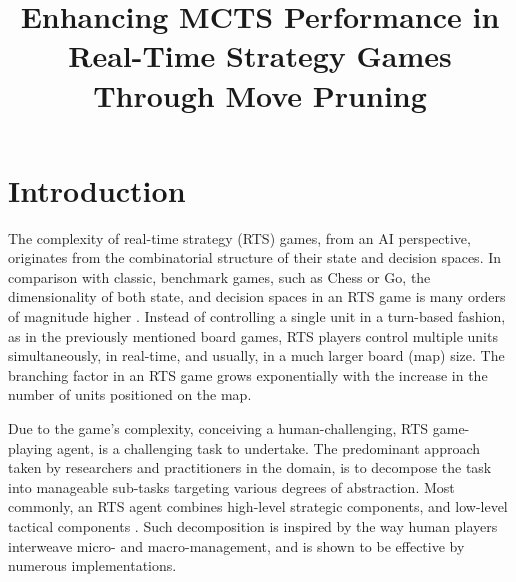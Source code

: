 \documentclass[conference]{IEEEtran}
\begin{document}
\title{Enhancing MCTS Performance in Real-Time Strategy Games Through Move Pruning}

\author{


}

\maketitle

\begin{abstract}

\end{abstract}

\begin{IEEEkeywords}

\end{IEEEkeywords}

\section{Introduction}

The complexity of real-time strategy (RTS) games, from an AI perspective, originates from the combinatorial structure of their state and decision spaces. In comparison with classic, benchmark games, such as Chess or Go, the dimensionality of both state, and decision spaces in an RTS game is many orders of magnitude higher \cite{ontanon_survey_2013}. Instead of controlling a single unit in a turn-based fashion, as in the previously mentioned board games, RTS players control multiple units simultaneously, in real-time, and usually, in a much larger board (map) size. The branching factor in an RTS game grows exponentially with the increase in the number of units positioned on the map.

Due to the game's complexity, conceiving a human-challenging, RTS game-playing agent, is a challenging task to undertake. The predominant approach taken by researchers and practitioners in the domain, is to decompose the task into manageable sub-tasks targeting various degrees of abstraction. Most commonly, an RTS agent combines high-level strategic components, and low-level tactical components \cite{barriga_combining_2017}. Such decomposition is inspired by the way human players interweave micro- and macro-management, and is shown to be effective by numerous implementations.
\end{document}
